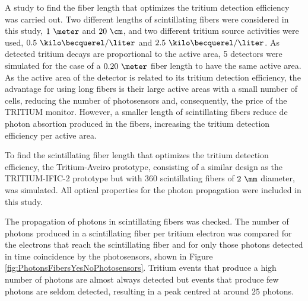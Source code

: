 A study to find the fiber length that optimizes the tritium detection efficiency was carried out. Two different lengths of scintillating fibers were considered in this study, $1~\meter$ and $20~\cm$, and two different tritium source activities were used, $0.5~\kilo\becquerel/\liter$ and $2.5~\kilo\becquerel/\liter$. As detected tritium decays are proportional to the active area, 5 detectors were simulated for the case of a $0.20~\meter$ fiber length to have the same active area. As the active area of the detector is related to its tritium detection efficiency, the advantage for using long fibers is their large active areas with a small number of cells, reducing the number of photosensors and, consequently, the price of the TRITIUM monitor. However, a smaller length of scintillating fibers reduce de photon absortion produced in the fibers, increasing the tritium detection efficiency per active area.

To find the scintillating fiber length that optimizes the tritium detection efficiency, the Tritium-Aveiro prototype, consisting of a similar design as the TRITIUM-IFIC-2 prototype but with $360$ scintillating fibers of $2~\mm$ diameter, was simulated. All optical properties for the photon propagation were included in this study. 

The propagation of photons in scintillating fibers was checked. The number of photons produced in a scintillating fiber per tritium electron was compared for the electrons that reach the scintillating fiber and for only those photons detected in time coincidence by the photosensors, shown in Figure \ref{fig:PhotonsFibersYesNoPhotosensors}. Tritium events that produce a high number of photons are almost always detected but events that produce few photons are seldom detected, resulting in a peak centred at around $25$ photons.  

